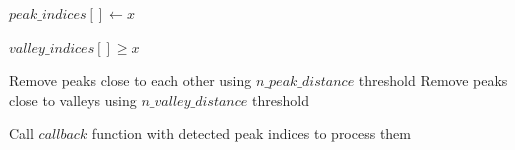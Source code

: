 \begin{algorithm}[ht]
\begin{algorithmic}[1]
            \State $peak\_indices[ ] \gets x$
        \EndIf
    \EndFor
\item[]

            \State $valley\_indices[ ] \ge x$
        \EndIf
    \EndFor
\item[]

    \State Remove peaks close to each other using $n\_peak\_distance$ threshold
    \State Remove peaks close to valleys using $n\_valley\_distance$ threshold
\item[]

    \State Call $callback$ function with detected peak indices to process them
    
\EndFunction
\end{algorithmic}
\end{algorithm}


